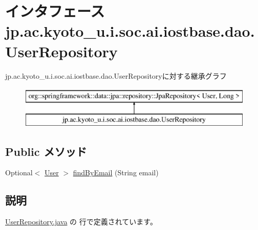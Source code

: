 \hypertarget{interfacejp_1_1ac_1_1kyoto__u_1_1i_1_1soc_1_1ai_1_1iostbase_1_1dao_1_1_user_repository}{\section{インタフェース jp.\-ac.\-kyoto\-\_\-u.\-i.\-soc.\-ai.\-iostbase.\-dao.\-User\-Repository}
\label{interfacejp_1_1ac_1_1kyoto__u_1_1i_1_1soc_1_1ai_1_1iostbase_1_1dao_1_1_user_repository}
}
jp.\-ac.\-kyoto\-\_\-u.\-i.\-soc.\-ai.\-iostbase.\-dao.\-User\-Repositoryに対する継承グラフ\begin{figure}[H]
\begin{center}
\leavevmode
\includegraphics[height=2.000000cm]{interfacejp_1_1ac_1_1kyoto__u_1_1i_1_1soc_1_1ai_1_1iostbase_1_1dao_1_1_user_repository}
\end{center}
\end{figure}
\subsection*{Public メソッド}
\begin{DoxyCompactItemize}
\item 
Optional$<$ \hyperlink{classjp_1_1ac_1_1kyoto__u_1_1i_1_1soc_1_1ai_1_1iostbase_1_1dao_1_1entity_1_1_user}{User} $>$ \hyperlink{interfacejp_1_1ac_1_1kyoto__u_1_1i_1_1soc_1_1ai_1_1iostbase_1_1dao_1_1_user_repository_af699a803bd8fd4d26106e2eec1a97d61}{find\-By\-Email} (String email)
\end{DoxyCompactItemize}


\subsection{説明}


 \hyperlink{_user_repository_8java_source}{User\-Repository.\-java} の  行で定義されています。



